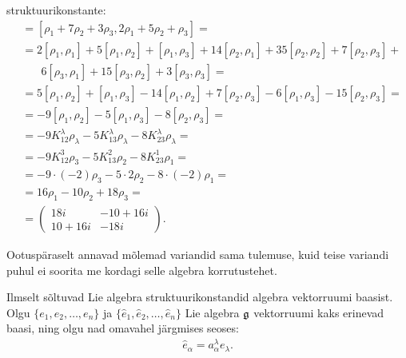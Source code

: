 \begin{naide}
    struktuurikonstante:
    \begin{align*}
        [x, y] &= [\rho_1 + 7\rho_2 + 3\rho_3,
                  2\rho_1 + 5\rho_2 + \rho_3] = \\
        &= 2[\rho_1, \rho_1] + 5[\rho_1, \rho_2] + [\rho_1, \rho_3] +
            14[\rho_2, \rho_1] + 35[\rho_2, \rho_2] +
            7[\rho_2, \rho_3] + \\
        &\phantom{=}\, \ 6[\rho_3, \rho_1] + 15[\rho_3, \rho_2] +
            3[\rho_3, \rho_3] = \\
        &= 5[\rho_1, \rho_2] + [\rho_1, \rho_3] - 14[\rho_1, \rho_2] +
            7[\rho_2, \rho_3] - 6[\rho_1, \rho_3] -
            15[\rho_2, \rho_3] = \\
        &= -9[\rho_1, \rho_2] -5[\rho_1, \rho_3] -
            8[\rho_2, \rho_3] = \\
        &= -9 K_{12}^{\lambda} \rho_\lambda
           -5 K_{13}^{\lambda} \rho_\lambda
           -8 K_{23}^{\lambda} \rho_\lambda = \\
        &= -9 K_{12}^{3} \rho_3
           -5 K_{13}^{2} \rho_2
           -8 K_{23}^{1} \rho_1 = \\
        &= -9 \cdot (-2) \rho_3
           -5 \cdot 2 \rho_2
           -8 \cdot (-2) \rho_1 = \\
        &= 16 \rho_1 - 10 \rho_2 + 18 \rho_3 = \\[0.1cm]
        &= \begin{pmatrix}
               18i & -10+16i \\
            10+16i &    -18i
        \end{pmatrix}.
    \end{align*}

    Ootuspäraselt annavad mõlemad variandid sama tulemuse, kuid teise
    variandi puhul ei soorita me kordagi selle algebra korrutustehet.
\end{naide}

Ilmselt sõltuvad Lie algebra struktuurikonstandid algebra vektorruumi
baasist. Olgu $\{ e_1, e_2, \dots, e_n \}$ ja
$\{ \hat{e}_1, \hat{e}_2, \dots, \hat{e}_n \}$ Lie algebra $\mathfrak{g}$
vektorruumi kaks erinevad baasi, ning olgu nad omavahel järgmises
seoses:
\begin{align}\label{eq:str-konst-baasi-yleminek-1}
    \hat{e}_\alpha = a_\alpha^\lambda e_\lambda.
\end{align}

